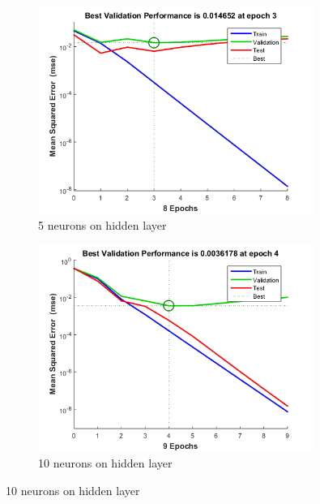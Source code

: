 \documentclass[12pt]{article}
\begin{document}
	\begin{figure}[H]
	\centering
	\begin{subfigure}{9cm}
	\centering\includegraphics[width=9cm]{images/perf5_1.png}
	\caption{5 neurons on hidden layer}
	\end{subfigure}%
	\begin{subfigure}{9cm}
	\centering\includegraphics[width=9cm]{images/perf10_1.png}
	\caption{10 neurons on hidden layer}
	\end{subfigure}\vspace{10pt}
	 

\end{figure}
\end{document}
